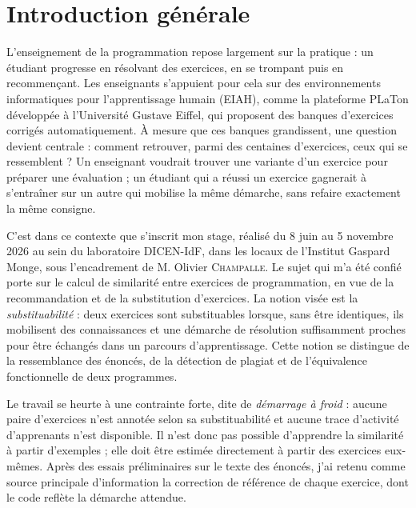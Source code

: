 \documentclass[12pt,a4paper,oneside]{report}
\begin{document}
\cleardoublepage
{}

\chapter*{Introduction générale}

L'enseignement de la programmation repose largement sur la pratique : un
étudiant progresse en résolvant des exercices, en se trompant puis en
recommençant. Les enseignants s'appuient pour cela sur des environnements
informatiques pour l'apprentissage humain (EIAH), comme la plateforme
PLaTon développée à l'Université Gustave Eiffel, qui proposent des banques
d'exercices corrigés automatiquement. À mesure que ces banques grandissent,
une question devient centrale : comment retrouver, parmi des centaines
d'exercices, ceux qui se ressemblent ? Un enseignant voudrait trouver une
variante d'un exercice pour préparer une évaluation ; un étudiant qui a
réussi un exercice gagnerait à s'entraîner sur un autre qui mobilise la
même démarche, sans refaire exactement la même consigne.

C'est dans ce contexte que s'inscrit mon stage, réalisé du 8 juin au
5 novembre 2026 au sein du laboratoire DICEN-IdF, dans les locaux de
l'Institut Gaspard Monge, sous l'encadrement de M. Olivier
\textsc{Champalle}. Le sujet qui m'a été confié porte sur le calcul de
similarité entre exercices de programmation, en vue de la recommandation
et de la substitution d'exercices. La notion visée est la
\emph{substituabilité} : deux exercices sont substituables lorsque, sans
être identiques, ils mobilisent des connaissances et une démarche de
résolution suffisamment proches pour être échangés dans un parcours
d'apprentissage. Cette notion se distingue de la ressemblance des énoncés,
de la détection de plagiat et de l'équivalence fonctionnelle de deux
programmes.

Le travail se heurte à une contrainte forte, dite de \emph{démarrage à
froid} : aucune paire d'exercices n'est annotée selon sa substituabilité et
aucune trace d'activité d'apprenants n'est disponible. Il n'est donc pas
possible d'apprendre la similarité à partir d'exemples ; elle doit être
estimée directement à partir des exercices eux-mêmes. Après des essais
préliminaires sur le texte des énoncés, j'ai retenu comme source principale
d'information la correction de référence de chaque exercice, dont le code
reflète la démarche attendue.
\end{document}
